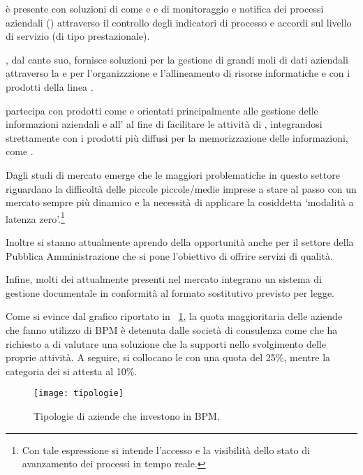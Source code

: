  è presente con soluzioni di  come  e  e \sw di monitoraggio e notifica dei processi aziendali () attraverso il controllo degli indicatori di processo  e accordi sul livello di servizio (di tipo prestazionale).

, dal canto suo, fornisce soluzioni per la gestione di grandi moli di dati aziendali attraverso la   e per l'organizzzione e l'allineamento di risorse informatiche e  con i prodotti della linea .

 partecipa con prodotti come  e  orientati principalmente alle gestione delle informazioni aziendali e all' al fine di facilitare le attività di , integrandosi strettamente con i prodotti  più diffusi per la memorizzazione delle informazioni, come .

Dagli studi di mercato emerge che le maggiori problematiche in questo settore riguardano la difficoltà delle piccole piccole/medie imprese a stare al passo con un mercato sempre più dinamico e la necessità di applicare la cosiddetta `modalità a latenza zero'.\footnote{Con tale espressione si intende l'accesso e la visibilità dello stato di avanzamento dei processi in tempo reale.}

Inoltre si stanno attualmente aprendo della opportunità anche per il settore della Pubblica Amministrazione che si pone l'obiettivo di offrire servizi di qualità.

Infine, molti dei \sw attualmente presenti nel mercato integrano un sistema di gestione documentale in conformità al formato sostitutivo previsto per legge.

Come si evince dal grafico riportato in \figurename~\ref{fig:tipologie}, la quota maggioritaria delle aziende che fanno utilizzo di \sw BPM è detenuta dalle società di consulenza come \customer che ha richiesto a \team di valutare una soluzione che la supporti nello svolgimento delle proprie attività. A seguire, si collocano le \sw {} con una quota del 25\%, mentre la categoria dei  si attesta al 10\%.

\begin{figure}[H]
  \centering
  \texttt{[image: tipologie]}
  \caption{Tipologie di aziende che investono in \sw BPM.}
  \label{fig:tipologie}
\end{figure}

